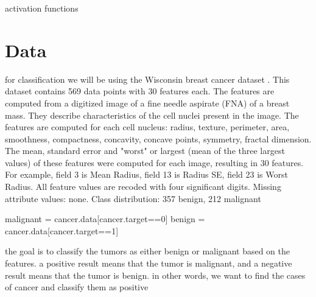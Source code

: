 \documentclass[twoside,11pt]{report}
\begin{document}
activation functions




\section{Data}
\label{sec:data}
for classification we will be using the Wisconsin breast cancer dataset \cite{wdbc}. This dataset contains 569 data points
with 30 features each. The features are computed from a digitized image of a fine needle aspirate (FNA) of a breast mass.
They describe characteristics of the cell nuclei present in the image. The features are computed for each cell nucleus:
radius, texture, perimeter, area, smoothness, compactness, concavity, concave points, symmetry, fractal dimension.
The mean, standard error and "worst" or largest (mean of the three largest values) of these features were computed for each image,
resulting in 30 features. For example, field 3 is Mean Radius, field 13 is Radius SE, field 23 is Worst Radius.
All feature values are recoded with four significant digits. Missing attribute values: none.
Class distribution: 357 benign, 212 malignant

malignant = cancer.data[cancer.target==0]
benign = cancer.data[cancer.target==1]

the goal is to classify the tumors as either benign or malignant based on the features.
a positive result means that the tumor is malignant, and a negative result means that the tumor is benign.
in other words, we want to find the cases of cancer and classify them as positive
\end{document}
